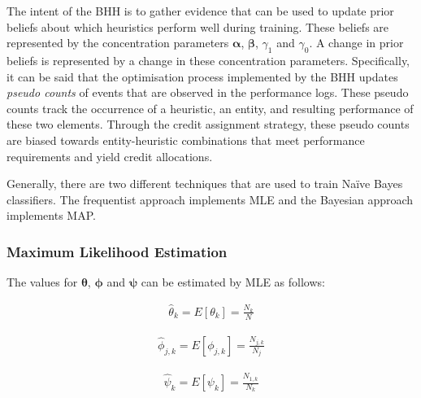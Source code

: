 The intent of the \acs{BHH} is to gather evidence that can be used to update prior beliefs about which heuristics perform well during training. These beliefs are represented by the concentration parameters $\boldsymbol{\alpha}$, $\boldsymbol{\beta}$, $\gamma_{1}$ and $\gamma_{0}$. A change in prior beliefs is represented by a change in these concentration parameters. Specifically, it can be said that the optimisation process implemented by the \acs{BHH} updates \textit{pseudo counts} of events that are observed in the performance logs. These pseudo counts track the occurrence of a heuristic, an entity, and resulting performance of these two elements. Through the credit assignment strategy, these pseudo counts are biased towards entity-heuristic combinations that meet performance requirements and yield credit allocations.

Generally, there are two different techniques that are used to train Naïve Bayes classifiers. The frequentist approach implements \acf{MLE} and the Bayesian approach implements \acf{MAP}.


\subsubsection{Maximum Likelihood Estimation}\label{sec:bhh:optimisation_step:mle}

The values for $\boldsymbol{\theta}$, $\boldsymbol{\phi}$ and $\boldsymbol{\psi}$ can be estimated by \acs{MLE} as follows:

\begin{equation}
	\label{eq:bhh:optimisation_step:mle:theta}
	\begin{split}
		\hat{\theta}_{k} = E[\theta_{k}] = \frac{N_{k}}{N}
	\end{split}
\end{equation}

\begin{equation}
	\label{eq:bhh:optimisation_step:mle:phi}
	\begin{split}
		\hat{\phi}_{j,k} = E[\phi_{j,k}] = \frac{N_{j,k}}{N_{j}}
	\end{split}
\end{equation}

\begin{equation}
	\label{eq:bhh:optimisation_step:mle:psi}
	\begin{split}
		\hat{\psi}_{k} = E[\psi_{k}] = \frac{N_{1,k}}{N_{k}}
	\end{split}
\end{equation}

